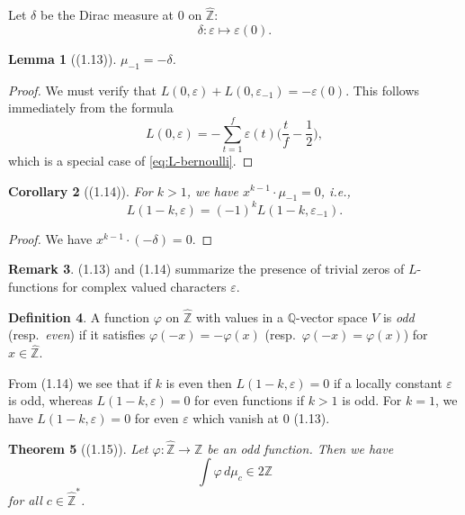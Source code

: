\documentclass[12pt,a4paper]{article}
\theoremstyle{plain}
\newtheorem{theorem}{Theorem}[section]
\newtheorem{lemma}[theorem]{Lemma}
\newtheorem{corollary}[theorem]{Corollary}
\theoremstyle{definition}
\newtheorem{definition}[theorem]{Definition}
\newtheorem{remark0}[theorem]{Remark}
\newcommand{\Z}{\mathbb{Z}}
\newcommand{\Q}{\mathbb{Q}}
\begin{document}
Let $\delta$ be the Dirac measure at $0$ on $\hat{\Z}$:
\[
\delta:\varepsilon\mapsto\varepsilon(0).
\]

\begin{lemma}[(1.13)]\label{lem:parity}
$\mu_{-1}=-\delta$.
\end{lemma}

\begin{proof}
We must verify that $L(0,\varepsilon)+L(0,\varepsilon_{-1})=-\varepsilon(0)$. This follows immediately from the formula
\[
L(0,\varepsilon)=-\sum_{t=1}^{f}\varepsilon(t)\Big(\frac{t}{f}-\frac{1}{2}\Big),
\]
which is a special case of \eqref{eq:L-bernoulli}.
\end{proof}

\begin{corollary}[(1.14)]\label{cor:parity}
For $k>1$, we have $x^{k-1}\cdot\mu_{-1}=0$, i.e.,
\[
L(1-k,\varepsilon)=(-1)^kL(1-k,\varepsilon_{-1}).
\]
\end{corollary}

\begin{proof}
We have $x^{k-1}\cdot(-\delta)=0$.
\end{proof}

\begin{remark0}
(1.13) and (1.14) summarize the presence of trivial zeros of $L$-functions for complex valued characters $\varepsilon$.
\end{remark0}

\begin{definition}
A function $\varphi$ on $\hat{\Z}$ with values in a $\Q$-vector space $V$ is \textit{odd} (resp.~\textit{even}) if it satisfies $\varphi(-x)=-\varphi(x)$ (resp.~$\varphi(-x)=\varphi(x)$) for $x\in\hat{\Z}$.
\end{definition}

From (1.14) we see that if $k$ is even then $L(1-k,\varepsilon)=0$ if a locally constant $\varepsilon$ is odd, whereas $L(1-k,\varepsilon)=0$ for even functions if $k>1$ is odd. For $k=1$, we have $L(1-k,\varepsilon)=0$ for even $\varepsilon$ which vanish at $0$ (1.13).

\begin{theorem}[(1.15)]\label{thm:odd}
Let $\varphi:\hat{\Z}\to\Z$ be an odd function. Then we have
\[
\int\varphi\,d\mu_c\in2\Z
\]
for all $c\in\hat{\Z}^*$.
\end{theorem}
\end{document}
